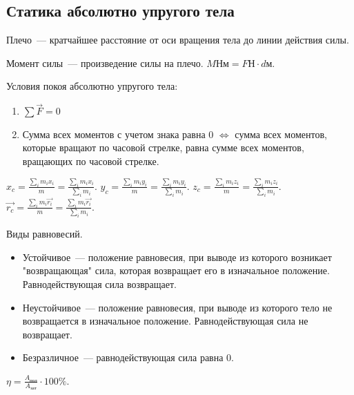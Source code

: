 \documentclass[12pt]{article}
\begin{document}
	\subsection{Статика абсолютно упругого тела}
	\begin{definition}
		Плечо~--- кратчайшее расстояние от оси вращения тела до линии действия силы.
	\end{definition}
	\begin{definition}
		Момент силы~--- произведение силы на плечо. $M \text{Нм} = F \text{Н} \cdot d \text{м}$.
	\end{definition}
	\begin{definition}
		Условия покоя абсолютно упругого тела:
		\begin{enumerate}
			\item $\sum \vec{F} = 0$
			\item Сумма всех моментов с учетом знака равна $0$ $\Leftrightarrow$ сумма всех моментов, которые вращают по часовой стрелке, равна сумме всех моментов, вращающих по часовой стрелке.
		\end{enumerate}
	\end{definition}
	\begin{definition}
		$x_c = \frac{\sum\limits_i m_i x_i}{m} = \frac{\sum\limits_i m_i x_i}{\sum\limits_i m_i}$. $y_c = \frac{\sum\limits_i m_i y_i}{m} = \frac{\sum\limits_i m_i y_i}{\sum\limits_i m_i}$. $z_c = \frac{\sum\limits_i m_i z_i}{m} = \frac{\sum\limits_i m_i z_i}{\sum\limits_i m_i}$. $\vec{r_c} = \frac{\sum\limits_i m_i \vec{r_i}}{m} = \frac{\sum\limits_i m_i \vec{r_i}}{\sum\limits_i m_i}$.
	\end{definition}
	\begin{definition}
		Виды равновесий.
		\begin{itemize}
			\item Устойчивое~--- положение равновесия, при выводе из которого возникает "возвращающая" сила, которая возвращает его в изначальное положение. Равнодействующая сила возвращает.
			\item Неустойчивое~--- положение равновесия, при выводе из которого тело не возвращается в изначальное положение. Равнодействующая сила не возвращает.
			\item Безразличное~--- равнодействующая сила равна $0$.
		\end{itemize}
	\end{definition}
	\begin{definition}[КПД]
		$\eta = \frac{A_{\text{пол}}}{A_{\text{зат}}} \cdot 100\%$.
	\end{definition}
\end{document}
